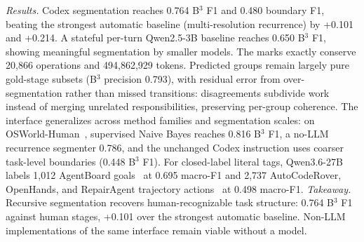 \documentclass[sigconf,nonacm]{acmart}
\newif\ifshowappendix
\newcommand{\appnote}[1]{\ifshowappendix{} (#1)\fi}
\begin{document}
\emph{Results.} Codex segmentation reaches 0.764 B$^3$ F1 and 0.480
boundary F1, beating the strongest automatic baseline (multi-resolution recurrence) by +0.101 and +0.214\appnote{Appendix~\ref{app:rq3} intervals}.
A stateful per-turn Qwen2.5-3B baseline reaches 0.650 B$^3$ F1, showing meaningful segmentation by smaller models.
The marks exactly conserve 20{,}866 operations and
494{,}862{,}929 tokens.
Predicted groups remain largely pure gold-stage subsets
(B$^3$ precision 0.793), with residual error from over-segmentation
rather than missed transitions: disagreements subdivide work instead of merging unrelated responsibilities,
preserving per-group coherence\appnote{breakdown in Appendix~\ref{app:rq3}}.
The interface generalizes across method families and segmentation scales: on OSWorld-Human~\cite{osworldhuman}, supervised Naive Bayes reaches 0.816 B$^3$ F1, a no-LLM recurrence segmenter 0.786, and the unchanged Codex instruction uses coarser task-level boundaries (0.448 B$^3$ F1). %
For closed-label literal tags, Qwen3.6-27B~\cite{qwen36} labels 1{,}012 AgentBoard goals~\cite{agentboard} at 0.695 macro-F1 and 2{,}737 AutoCodeRover, OpenHands, and RepairAgent trajectory actions~\cite{traceview-2026,bouzenia-pradel-2025-trajectories} at 0.498 macro-F1. %
\emph{Takeaway.} Recursive segmentation recovers human-recognizable task structure: 0.764 B$^3$ F1 against human stages, +0.101 over the strongest automatic baseline. Non-LLM implementations of the same interface remain viable without a model.
\end{document}
